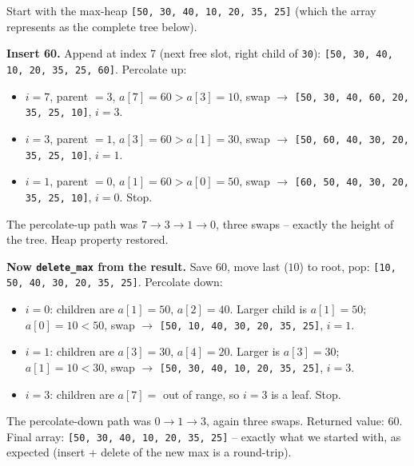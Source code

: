 \documentclass[11pt]{article}
\begin{document}
\begin{examplebox}
Start with the max-heap \texttt{[50, 30, 40, 10, 20, 35, 25]} (which
the array represents as the complete tree below).

\begin{center}
\end{center}

\textbf{Insert 60.} Append at index 7 (next free slot, right child of
\texttt{30}): \texttt{[50, 30, 40, 10, 20, 35, 25, 60]}. Percolate up:
\begin{itemize}[leftmargin=*]
    \item $i=7$, parent $= 3$, $a[7]=60 > a[3]=10$, swap $\to$
          \texttt{[50, 30, 40, 60, 20, 35, 25, 10]}, $i=3$.
    \item $i=3$, parent $= 1$, $a[3]=60 > a[1]=30$, swap $\to$
          \texttt{[50, 60, 40, 30, 20, 35, 25, 10]}, $i=1$.
    \item $i=1$, parent $= 0$, $a[1]=60 > a[0]=50$, swap $\to$
          \texttt{[60, 50, 40, 30, 20, 35, 25, 10]}, $i=0$. Stop.
\end{itemize}

The percolate-up path was $7 \to 3 \to 1 \to 0$, three swaps -- exactly
the height of the tree. Heap property restored.

\textbf{Now \texttt{delete\_max} from the result.} Save $60$, move
last ($10$) to root, pop: \texttt{[10, 50, 40, 30, 20, 35, 25]}.
Percolate down:
\begin{itemize}[leftmargin=*]
    \item $i=0$: children are $a[1]=50$, $a[2]=40$. Larger child is
          $a[1]=50$; $a[0]=10 < 50$, swap $\to$
          \texttt{[50, 10, 40, 30, 20, 35, 25]}, $i=1$.
    \item $i=1$: children are $a[3]=30$, $a[4]=20$. Larger is
          $a[3]=30$; $a[1]=10 < 30$, swap $\to$
          \texttt{[50, 30, 40, 10, 20, 35, 25]}, $i=3$.
    \item $i=3$: children are $a[7]=$ out of range, so $i=3$ is a
          leaf. Stop.
\end{itemize}

The percolate-down path was $0 \to 1 \to 3$, again three swaps.
Returned value: $60$. Final array: \texttt{[50, 30, 40, 10, 20, 35,
25]} -- exactly what we started with, as expected (insert + delete
of the new max is a round-trip).
\end{examplebox}
\end{document}
